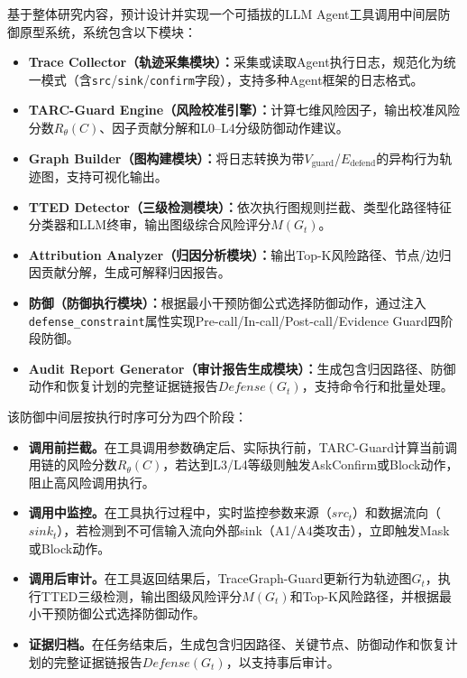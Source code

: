 基于整体研究内容，预计设计并实现一个可插拔的LLM Agent工具调用中间层防御原型系统，系统包含以下模块：

\begin{itemize}[leftmargin=2em,itemsep=0pt]
  \item \textbf{Trace Collector（轨迹采集模块）：}采集或读取Agent执行日志，规范化为统一模式（含\texttt{src}/\texttt{sink}/\texttt{confirm}字段），支持多种Agent框架的日志格式。
  \item \textbf{TARC-Guard Engine（风险校准引擎）：}计算七维风险因子，输出校准风险分数$R_\theta(C)$、因子贡献分解和L0--L4分级防御动作建议。
  \item \textbf{Graph Builder（图构建模块）：}将日志转换为带$V_{\text{guard}}$/$E_{\text{defend}}$的异构行为轨迹图，支持可视化输出。
  \item \textbf{TTED Detector（三级检测模块）：}依次执行图规则拦截、类型化路径特征分类器和LLM终审，输出图级综合风险评分$M(G_t)$。
  \item \textbf{Attribution Analyzer（归因分析模块）：}输出Top-K风险路径、节点/边归因贡献分解，生成可解释归因报告。
  \item \textbf{防御（防御执行模块）：}根据最小干预防御公式选择防御动作，通过注入\texttt{defense\_constraint}属性实现Pre-call/In-call/Post-call/Evidence Guard四阶段防御。
  \item \textbf{Audit Report Generator（审计报告生成模块）：}生成包含归因路径、防御动作和恢复计划的完整证据链报告$Defense(G_t)$，支持命令行和批量处理。
\end{itemize}


该防御中间层按执行时序可分为四个阶段：

\begin{itemize}[leftmargin=2em,itemsep=0pt]
  \item \textbf{调用前拦截。}在工具调用参数确定后、实际执行前，TARC-Guard计算当前调用链的风险分数$R_\theta(C)$，若达到L3/L4等级则触发AskConfirm或Block动作，阻止高风险调用执行。

  \item \textbf{调用中监控。}在工具执行过程中，实时监控参数来源（$src_t$）和数据流向（$sink_t$），若检测到不可信输入流向外部sink（A1/A4类攻击），立即触发Mask或Block动作。

  \item \textbf{调用后审计。}在工具返回结果后，TraceGraph-Guard更新行为轨迹图$G_t$，执行TTED三级检测，输出图级风险评分$M(G_t)$和Top-K风险路径，并根据最小干预防御公式选择防御动作。

  \item \textbf{证据归档。}在任务结束后，生成包含归因路径、关键节点、防御动作和恢复计划的完整证据链报告$Defense(G_t)$，以支持事后审计。
\end{itemize}


